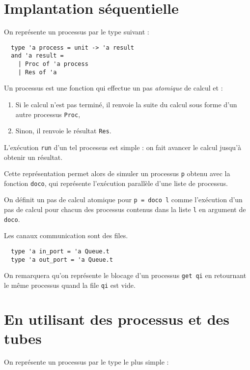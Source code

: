 \documentclass[11pt]{article}
\begin{document}
\section{Implantation s\'equentielle}

On repr\'esente un processus par le type suivant :

\begin{lstlisting}
  type 'a process = unit -> 'a result
  and 'a result =
    | Proc of 'a process
    | Res of 'a
\end{lstlisting}

Un processus est une fonction qui effectue
un pas {\em atomique} de calcul et :

\begin{enumerate}
  \item Si le calcul n'est pas termin\'e,
    il renvoie la suite du calcul sous forme d'un autre processus {\tt Proc},
  \item Sinon, il renvoie le r\'esultat {\tt Res}.
\end{enumerate}

L'ex\'ecution {\tt run} d'un tel processus est simple :
on fait avancer le calcul jusqu'\`a obtenir un r\'esultat.

\smallskip

Cette repr\'esentation permet alors de simuler un processus {\tt p}
obtenu avec la fonction {\tt doco}, qui repr\'esente l'ex\'ecution
parall\`ele d'une liste de processus.

On d\'efinit un pas de calcul atomique pour {\tt p = doco l}
comme l'ex\'ecution d'un pas de calcul pour chacun des processus
contenus dans la liste {\tt l} en argument de {\tt doco}.

\smallskip

Les canaux communication sont des files.

\begin{lstlisting}
  type 'a in_port = 'a Queue.t
  type 'a out_port = 'a Queue.t
\end{lstlisting}

On remarquera qu'on repr\'esente le blocage d'un processus {\tt get qi}
en retournant le m\^eme processus quand la file {\tt qi} est vide.

\section{En utilisant des processus et des tubes}

On repr\'esente un processus par le type le plus simple :
\end{document}
